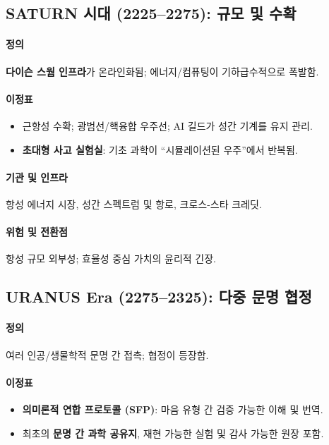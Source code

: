 \documentclass[11pt]{article}
\begin{document}
\subsection{SATURN 시대 (2225–2275): 규모 및 수확}
\paragraph{정의} \textbf{다이슨 스웜 인프라}가 온라인화됨; 에너지/컴퓨팅이 기하급수적으로 폭발함.

\paragraph{이정표}
\begin{itemize}[noitemsep]
  \item 근항성 수확; 광범선/핵융합 우주선; AI 길드가 성간 기계를 유지 관리.
  \item \textbf{초대형 사고 실험실}: 기초 과학이 ``시뮬레이션된 우주''에서 반복됨.
\end{itemize}

\paragraph{기관 및 인프라} 항성 에너지 시장, 성간 스펙트럼 및 항로, 크로스-스타 크레딧.

\paragraph{위험 및 전환점} 항성 규모 외부성; 효율성 중심 가치의 윤리적 긴장.

\subsection{URANUS Era (2275–2325): 다중 문명 협정}
\paragraph{정의} 여러 인공/생물학적 문명 간 접촉; 협정이 등장함.

\paragraph{이정표}
\begin{itemize}[noitemsep]
  \item \textbf{의미론적 연합 프로토콜 (SFP)}: 마음 유형 간 검증 가능한 이해 및 번역.
  \item 최초의 \textbf{문명 간 과학 공유지}, 재현 가능한 실험 및 감사 가능한 원장 포함.
\end{itemize}
\end{document}
